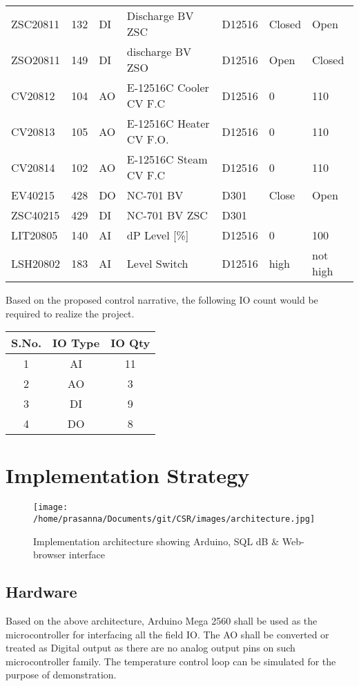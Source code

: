 \documentclass[a4paper,oneside]{article}
\begin{document}
\begin{center}
\begin{tabular}{lllllll}
ZSC20811 & 132 & DI & Discharge BV ZSC & D12516 & Closed & Open\\
ZSO20811 & 149 & DI & discharge BV ZSO & D12516 & Open & Closed\\
CV20812 & 104 & AO & E-12516C Cooler CV F.C & D12516 & 0 & 110\\
CV20813 & 105 & AO & E-12516C Heater CV F.O. & D12516 & 0 & 110\\
CV20814 & 102 & AO & E-12516C Steam CV F.C & D12516 & 0 & 110\\
EV40215 & 428 & DO & NC-701 BV & D301 & Close & Open\\
ZSC40215 & 429 & DI & NC-701 BV ZSC & D301 &  & \\
LIT20805 & 140 & AI & dP Level [\%] & D12516 & 0 & 100\\
LSH20802 & 183 & AI & Level Switch & D12516 & high & not high\\
\end{tabular}
\end{center}

Based on the proposed control narrative, the following IO count would be required to realize the project. 
\begin{center}
\begin{tabular}{ccc}
S.No. & IO Type & IO Qty\\
\hline
1 & AI & 11\\
2 & AO & 3\\
3 & DI & 9\\
4 & DO & 8\\
\end{tabular}
\end{center}

\clearpage
\section{Implementation Strategy}
\label{sec:orgfb8ca20}
\begin{figure}[htbp]
\centering
\texttt{[image: /home/prasanna/Documents/git/CSR/images/architecture.jpg]}
\caption{Implementation architecture showing Arduino, SQL dB \& Web-browser interface}
\end{figure}
\clearpage
\subsection{Hardware}
\label{sec:org978ce6f}
Based on the above architecture, Arduino Mega 2560 shall be used as
the microcontroller for interfacing all the field IO. The AO shall be
converted or treated as Digital output as there are no analog output
pins on such microcontroller family. The temperature control loop can
be simulated for the purpose of demonstration. 
\end{document}
